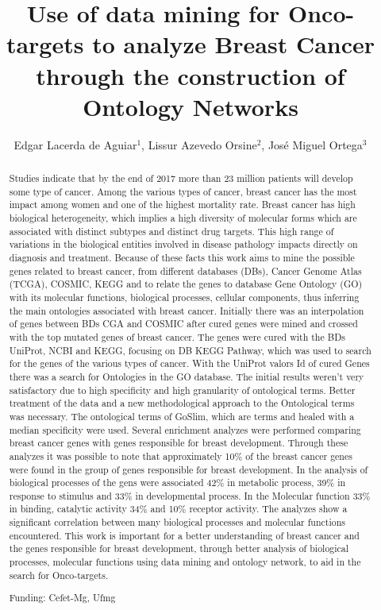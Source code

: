 \documentclass[twoside]{article}
\title{\vspace{-15mm}\fontsize{24pt}{10pt}\selectfont\textbf{Use of data mining for Onco-targets to analyze Breast Cancer through the construction of Ontology Networks}} %
\author{Edgar Lacerda de Aguiar$^1$, Lissur Azevedo Orsine$^2$, Jos\'e Miguel Ortega$^3$}
\affil{1 CEFET-MG\\ 2 UFMG\\ 3 UFMG, LABORAT\'ORIO DE BIODADOS\\ }
\date{}
\begin{document}
\maketitle %

\thispagestyle{fancy} %


\begin{abstract}
Studies indicate that by the end of 2017 more than 23 million patients will develop some type of cancer. Among the various types of cancer, breast cancer has the most impact among women and one of the highest mortality rate. Breast cancer has high biological heterogeneity, which implies a high diversity of molecular forms which are associated with distinct subtypes and distinct drug targets. This high range of variations in the biological entities involved in disease pathology impacts directly on diagnosis and treatment. Because of these facts this work aims to mine the possible genes related to breast cancer, from different databases (DBs), Cancer Genome Atlas (TCGA), COSMIC, KEGG and to relate the genes to database Gene Ontology (GO) with its molecular functions, biological processes, cellular components, thus inferring the main ontologies associated with breast cancer. Initially there was an interpolation of genes between BDs CGA and COSMIC after cured genes were mined and crossed with the top mutated genes of breast cancer. The genes were cured with the BDs UniProt, NCBI and KEGG, focusing on DB KEGG Pathway, which was used to search for the genes of the various types of cancer. With the UniProt valors Id of cured Genes there was a search for Ontologies in the GO database. The initial results weren't very satisfactory due to high specificity and high granularity of ontological terms. Better treatment of the data and a new methodological approach to the Ontological terms was necessary. The ontological terms of GoSlim, which are terms and healed with a median specificity were used. Several enrichment analyzes were performed comparing breast cancer genes with genes responsible for breast development. Through these analyzes it was possible to note that approximately 10\% of the breast cancer genes were found in the group of genes responsible for breast development. In the analysis of biological processes of the gens were associated 42\% in metabolic process, 39\% in response to stimulus and 33\% in developmental process. In the Molecular function 33\% in binding, catalytic activity 34\% and 10\% receptor activity. The analyzes show a significant correlation between many biological processes and molecular functions encountered. This work is important for a better understanding of breast cancer and the genes responsible for breast development, through better analysis of biological processes, molecular functions using data mining and ontology network, to aid in the search for Onco-targets.

Funding: Cefet-Mg, Ufmg
\end{abstract}
\end{document}
